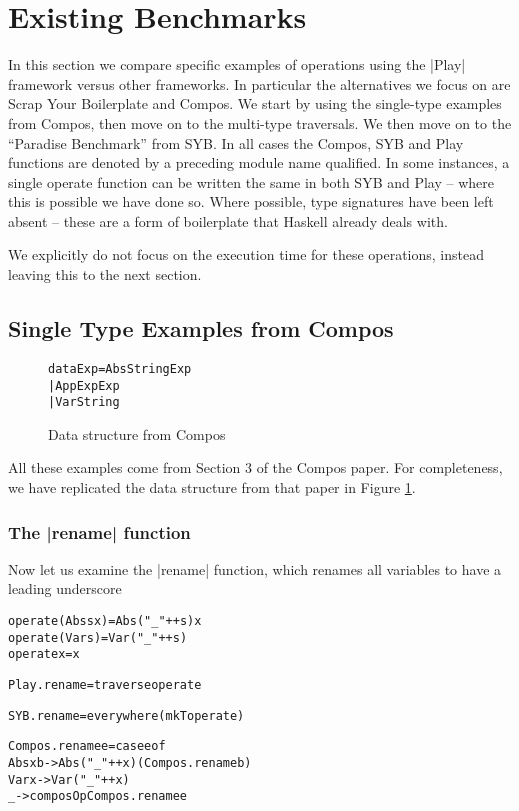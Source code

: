 \documentclass[preprint]{sigplanconf}
\newenvironment{code}{\begin{alltt}\small}{\end{alltt}}
\begin{document}
\section{Existing Benchmarks}

In this section we compare specific examples of operations using the |Play| framework versus other frameworks. In particular the alternatives we focus on are Scrap Your Boilerplate and Compos. We start by using the single-type examples from Compos, then move on to the multi-type traversals. We then move on to the ``Paradise Benchmark'' from SYB. In all cases the Compos, SYB and Play functions are denoted by a preceding module name qualified. In some instances, a single operate function can be written the same in both SYB and Play -- where this is possible we have done so. Where possible, type signatures have been left absent -- these are a form of boilerplate that Haskell already deals with.

We explicitly do not focus on the execution time for these operations, instead leaving this to the next section.

\subsection{Single Type Examples from Compos}

\begin{figure}
\begin{code}
data Exp = Abs String Exp
         | App Exp Exp
         | Var String
\end{code}
\caption{Data structure from Compos}
\label{fig:compos1}
\end{figure}

All these examples come from Section 3 of the Compos paper. For completeness, we have replicated the data structure from that paper in Figure \ref{fig:compos1}.

\subsubsection{The |rename| function}

Now let us examine the |rename| function, which renames all variables to have a leading underscore

\begin{code}
operate (Abs  s x  )  = Abs  ("_" ++ s) x
operate (Var  s    )  = Var  ("_" ++ s)
operate x             = x

Play.rename = traverse operate

SYB.rename = everywhere (mkT operate)

Compos.rename e = case e of
    Abs x b  -> Abs ("_" ++ x) (Compos.rename b)
    Var x    -> Var ("_" ++ x)
    _        -> composOp Compos.rename e
\end{code}
\end{document}
